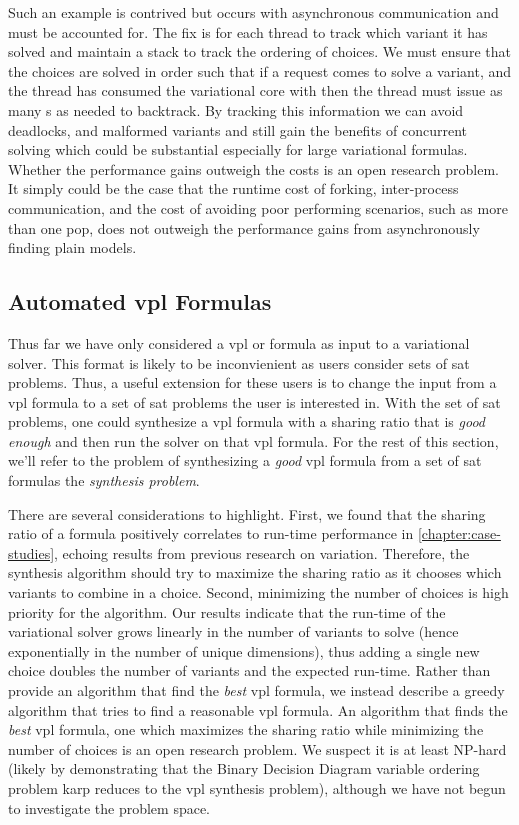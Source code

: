 Such an example is contrived but occurs with asynchronous communication and must
be accounted for. The fix is for each thread to track which variant it has
solved and maintain a stack to track the ordering of choices. We must ensure
that the choices are solved in order such that if a request comes to solve a
 variant, and the thread has consumed the variational core with
 then the thread must issue as many s as needed to
backtrack. By tracking this information we can avoid deadlocks, and malformed
variants and still gain the benefits of concurrent solving which could be
substantial especially for large variational formulas. Whether the performance
gains outweigh the costs is an open research problem. It simply could be the
case that the runtime cost of forking, inter-process communication, and the cost
of avoiding poor performing scenarios, such as more than one pop, does not
outweigh the performance gains from asynchronously finding plain models.

\subsection{Automated \ac{vpl} Formulas}
Thus far we have only considered a \ac{vpl} or \evpl{} formula as input to a
variational solver. This format is likely to be inconvienient as users consider
sets of \ac{sat} problems. Thus, a useful extension for these users is to change
the input from a \ac{vpl} formula to a set of \ac{sat} problems the user is
interested in. With the set of \ac{sat} problems, one could synthesize a
\ac{vpl} formula with a sharing ratio that is \emph{good enough} and then run
the solver on that \ac{vpl} formula. For the rest of this section, we'll refer
to the problem of synthesizing a \emph{good} \ac{vpl} formula from a set of
\ac{sat} formulas the \emph{synthesis problem}.

There are several considerations to highlight. First, we found that the sharing
ratio of a formula positively correlates to run-time performance in
\autoref{chapter:case-studies}, echoing results from previous research on
variation. Therefore, the synthesis algorithm should try to maximize the sharing
ratio as it chooses which variants to combine in a choice. Second, minimizing
the number of choices is high priority for the algorithm. Our results indicate
that the run-time of the variational solver grows linearly in the number of
variants to solve (hence exponentially in the number of unique dimensions), thus
adding a single new choice doubles the number of variants and the expected
run-time. Rather than provide an algorithm that find the \emph{best} \ac{vpl}
formula, we instead describe a greedy algorithm that tries to find a reasonable
\ac{vpl} formula. An algorithm that finds the \emph{best} \ac{vpl} formula,
\eg{} one which maximizes the sharing ratio while minimizing the number of
choices is an open research problem. We suspect it is at least NP-hard (likely
by demonstrating that the Binary Decision Diagram variable ordering problem karp
reduces to the \ac{vpl} synthesis problem), although we have not begun to
investigate the problem space.

